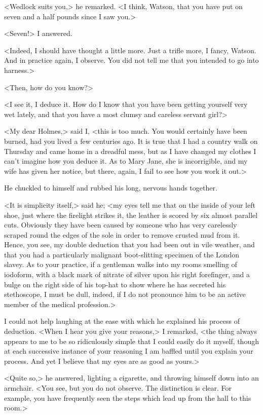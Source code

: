 <Wedlock suits you,> he remarked. <I think, Watson, that you have put on seven and a half pounds since I saw you.>

<Seven!> I answered.

<Indeed, I should have thought a little more. Just a trifle more, I fancy, Watson. And in practice again, I observe. You did not tell me that you intended to go into harness.>

<Then, how do you know?>

<I see it, I deduce it. How do I know that you have been getting yourself very wet lately, and that you have a most clumsy and careless servant girl?>

<My dear Holmes,> said I, <this is too much. You would certainly have been burned, had you lived a few centuries ago. It is true that I had a country walk on Thursday and came home in a dreadful mess, but as I have changed my clothes I can't imagine how you deduce it. As to Mary Jane, she is incorrigible, and my wife has given her notice, but there, again, I fail to see how you work it out.>

He chuckled to himself and rubbed his long, nervous hands together.

<It is simplicity itself,> said he; <my eyes tell me that on the inside of your left shoe, just where the firelight strikes it, the leather is scored by six almost parallel cuts. Obviously they have been caused by someone who has very carelessly scraped round the edges of the sole in order to remove crusted mud from it. Hence, you see, my double deduction that you had been out in vile weather, and that you had a particularly malignant boot-slitting specimen of the London slavey. As to your practice, if a gentleman walks into my rooms smelling of iodoform, with a black mark of nitrate of silver upon his right forefinger, and a bulge on the right side of his top-hat to show where he has secreted his stethoscope, I must be dull, indeed, if I do not pronounce him to be an active member of the medical profession.>

I could not help laughing at the ease with which he explained his process of deduction. <When I hear you give your reasons,> I remarked, <the thing always appears to me to be so ridiculously simple that I could easily do it myself, though at each successive instance of your reasoning I am baffled until you explain your process. And yet I believe that my eyes are as good as yours.>

<Quite so,> he answered, lighting a cigarette, and throwing himself down into an armchair. <You see, but you do not observe. The distinction is clear. For example, you have frequently seen the steps which lead up from the hall to this room.>

